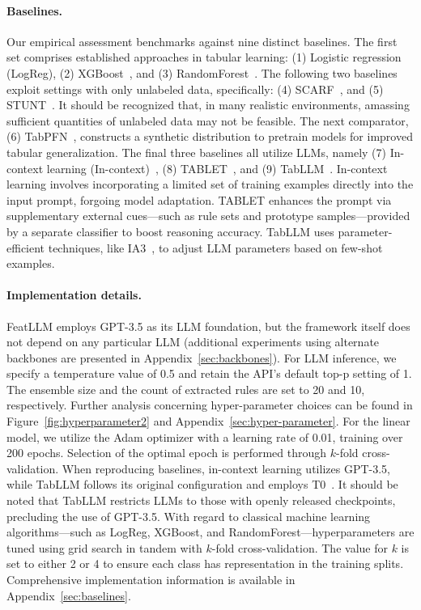\vspace*{-0.12in}
\paragraph{Baselines.}
Our empirical assessment benchmarks against nine distinct baselines. The first set comprises established approaches in tabular learning: (1) Logistic regression (LogReg), (2) XGBoost~\cite{chen2016xgboost}, and (3) RandomForest~\cite{ho1995random}. The following two baselines exploit settings with only unlabeled data, specifically: (4) SCARF~\cite{bahri2022scarf}, and (5) STUNT~\cite{nam2023stunt}. It should be recognized that, in many realistic environments, amassing sufficient quantities of unlabeled data may not be feasible. The next comparator, (6) TabPFN~\cite{hollmann2022tabpfn}, constructs a synthetic distribution to pretrain models for improved tabular generalization. The final three baselines all utilize LLMs, namely (7) In-context learning (In-context)~\cite{wei2022emergent}, (8) TABLET~\cite{slack2023tablet}, and (9) TabLLM~\cite{hegselmann2023tabllm}. In-context learning involves incorporating a limited set of training examples directly into the input prompt, forgoing model adaptation. TABLET enhances the prompt via supplementary external cues—such as rule sets and prototype samples—provided by a separate classifier to boost reasoning accuracy. TabLLM uses parameter-efficient techniques, like IA3~\cite{liu2022few}, to adjust LLM parameters based on few-shot examples.

\vspace*{-0.12in}
\paragraph{Implementation details.}
\textsf{FeatLLM} employs GPT-3.5 as its LLM foundation, but the framework itself does not depend on any particular LLM (additional experiments using alternate backbones are presented in Appendix~\ref{sec:backbones}). For LLM inference, we specify a temperature value of 0.5 and retain the API’s default top-p setting of 1. The ensemble size and the count of extracted rules are set to 20 and 10, respectively. Further analysis concerning hyper-parameter choices can be found in Figure~\ref{fig:hyperparameter2} and Appendix~\ref{sec:hyper-parameter}.
For the linear model, we utilize the Adam optimizer with a learning rate of 0.01, training over 200 epochs. Selection of the optimal epoch is performed through $k$-fold cross-validation. When reproducing baselines, in-context learning utilizes GPT-3.5, while TabLLM follows its original configuration and employs T0~\cite{sanh2022multitask}. It should be noted that TabLLM restricts LLMs to those with openly released checkpoints, precluding the use of GPT-3.5. With regard to classical machine learning algorithms—such as LogReg, XGBoost, and RandomForest—hyperparameters are tuned using grid search in tandem with $k$-fold cross-validation. The value for $k$ is set to either 2 or 4 to ensure each class has representation in the training splits. Comprehensive implementation information is available in Appendix~\ref{sec:baselines}.

